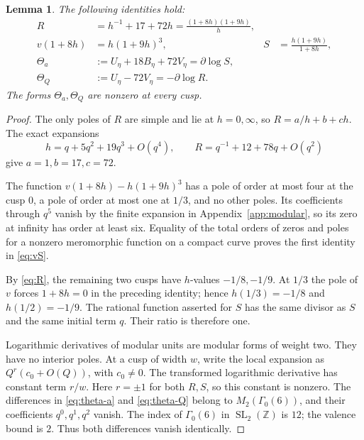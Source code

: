 \documentclass[11pt,a4paper]{article}
\newtheorem{lemma}[theorem]{Lemma}
\theoremstyle{remark}
\newcommand{\Z}{\mathbb Z}
\newcommand{\dd}{\partial}
\newcommand{\Gbase}{\Gamma_0(6)}
\begin{document}
\begin{lemma}\label{lem:eta}
The following identities hold:
\begin{align}
 R&=h^{-1}+17+72h=\frac{(1+8h)(1+9h)}h,\label{eq:R}\\
 v(1+8h)&=h(1+9h)^3,&
 S&=\frac{h(1+9h)}{1+8h},\label{eq:vS}\\
 \Theta_a&:=U_\eta+18B_\eta+72V_\eta=\dd\log S,\label{eq:theta-a}\\
 \Theta_Q&:=U_\eta-72V_\eta=-\dd\log R.\label{eq:theta-Q}
\end{align}
The forms $\Theta_a,\Theta_Q$ are nonzero at every cusp.
\end{lemma}
\begin{proof}
The only poles of $R$ are simple and lie at $h=0,\infty$, so
$R=a/h+b+ch$. The exact expansions
\[
 h=q+5q^2+19q^3+O(q^4),\qquad
 R=q^{-1}+12+78q+O(q^2)
\]
give $a=1,b=17,c=72$.

The function $v(1+8h)-h(1+9h)^3$ has a pole of order at most four at
the cusp $0$, a pole of order at most one at $1/3$, and no other poles.
Its coefficients through $q^5$ vanish by the finite expansion in
Appendix~\ref{app:modular}, so its zero at infinity has order at least
six. Equality of the total orders of zeros and poles for a nonzero
meromorphic function on a compact curve proves the first identity in
\eqref{eq:vS}.

By \eqref{eq:R}, the remaining two cusps have $h$-values $-1/8,-1/9$.
At $1/3$ the pole of $v$ forces $1+8h=0$ in the preceding identity;
hence $h(1/3)=-1/8$ and $h(1/2)=-1/9$. The rational function asserted
for $S$ has the same divisor as $S$ and the same initial term $q$.
Their ratio is therefore one.

Logarithmic derivatives of modular units are modular forms of weight
two. They have no interior poles. At a cusp of width $w$, write the
local expansion as $Q^r(c_0+O(Q))$, with $c_0\ne0$. The transformed
logarithmic derivative has constant term $r/w$. Here $r=\pm1$ for
both $R,S$, so this constant is nonzero. The differences in
\eqref{eq:theta-a} and \eqref{eq:theta-Q} belong to
$M_2(\Gbase)$, and their coefficients $q^0,q^1,q^2$ vanish.
The index of $\Gbase$ in $\operatorname{SL}_2(\Z)$ is $12$;
the valence bound is $2$. Thus both differences vanish identically.
\end{proof}
\end{document}

